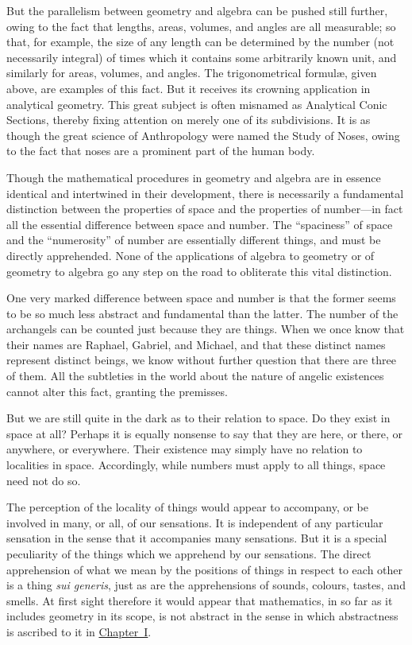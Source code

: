 \documentclass[12pt,leqno]{book}[2005/09/16]
\newcommand{\Chg}[2]{#2}
\newcommand{\ChapRef}[2][Chapter]{\hyperref[chapter:#2]{\Chg{#1}{Chapter}~#2}}
\newcommand{\PageSep}[1]{\ignorespaces}
\newcommand{\Foreign}[1]{\textit{#1}}
\begin{document}
But the parallelism between geometry and
algebra can be pushed still further, owing to
the fact that lengths, areas, volumes, and
\PageSep{240}
angles are all measurable; so that, for example,
the size of any length can be determined
by the number (not necessarily integral) of
times which it contains some arbitrarily known
unit, and similarly for areas, volumes, and
angles. The trigonometrical formulæ, given
above, are examples of this fact. But it receives
its crowning application in analytical
geometry. This great subject is often misnamed
as Analytical Conic Sections, thereby
%
fixing attention on merely one of its subdivisions.
It is as though the great science
of Anthropology were named the Study of
Noses, owing to the fact that noses are a
prominent part of the human body.

Though the mathematical procedures in
geometry and algebra are in essence identical
and intertwined in their development, there
is necessarily a fundamental distinction between
the properties of space and the properties
of number---in fact all the essential difference
between space and number. The ``spaciness''
of space and the ``numerosity'' of
number are essentially different things, and
must be directly apprehended. None of the
applications of algebra to geometry or of
geometry to algebra go any step on the road
to obliterate this vital distinction.

One very marked difference between space
and number is that the former seems to be so
much less abstract and fundamental than the
\PageSep{241}
latter. The number of the archangels can be
counted just because they are things. When
we once know that their names are Raphael,
Gabriel, and Michael, and that these distinct
names represent distinct beings, we know without
further question that there are three of
them. All the subtleties in the world about
the nature of angelic existences cannot alter
this fact, granting the premisses.

But we are still quite in the dark as to their
relation to space. Do they exist in space at
all? Perhaps it is equally nonsense to say
that they are here, or there, or anywhere, or
everywhere. Their existence may simply have
no relation to localities in space. Accordingly,
while numbers must apply to all things,
space need not do so.

The perception of the locality of things
would appear to accompany, or be involved
in many, or all, of our sensations. It is independent
of any particular sensation in the
sense that it accompanies many sensations.
But it is a special peculiarity of the things
which we apprehend by our sensations. The
direct apprehension of what we mean by the
positions of things in respect to each other
is a thing \Foreign{sui generis}, just as are the apprehensions
of sounds, colours, tastes, and smells.
At first sight therefore it would appear that
mathematics, in so far as it includes geometry
in its scope, is not abstract in the sense in
\PageSep{242}
which abstractness is ascribed to it in
\ChapRef{I}.
\end{document}
